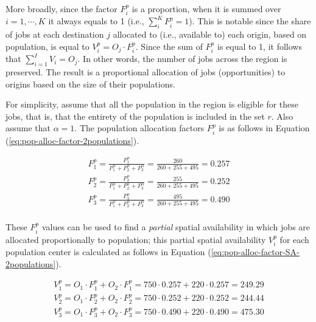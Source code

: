 \documentclass[]{elsarticle} %
\begin{document}
More broadly, since the factor \(F^p_{i}\) is a proportion, when it is
summed over \(i=1,\cdots,K\) it always equals to 1 (i.e.,
\(\sum_i^{K} F^p_{i} = 1\)). This is notable since the share of jobs at
each destination \(j\) allocated to (i.e., available to) each origin,
based on population, is equal to \(V^p_{i} = O_j \cdot F^p_{i}\). Since
the sum of \(F^p_{i}\) is equal to 1, it follows that
\(\sum_{i=1}^I V_{i} = O_j\). In other words, the number of jobs across
the region is preserved. The result is a proportional allocation of jobs
(opportunities) to origins based on the size of their populations.

For simplicity, assume that all the population in the region is eligible
for these jobs, that is, that the entirety of the population is included
in the set \(r\). Also assume that \(\alpha=1\). The population
allocation factors \(F^p_{i}\) is as follows in Equation
(\ref{eq:pop-alloc-factor-2populations}).

\begin{equation}
\label{eq:pop-alloc-factor-2populations}
\begin{array}{l}
F^p_{1} = \frac{P_1 ^\alpha}{P_1^\alpha + P_2^\alpha + P_3^\alpha} = \frac{260}{260 + 255 + 495} = 0.257\\
F^p_{2} = \frac{P_2^\alpha}{P_1^\alpha + P_2^\alpha + P_3^\alpha}  = \frac{255}{260 + 255 + 495} = 0.252\\
F^p_{3} = \frac{P_3^\alpha}{P_1^\alpha + P_2^\alpha + P_3^\alpha}  = \frac{495}{260 + 255 + 495} = 0.490\\
\end{array}
\end{equation}

These \(F^p_{i}\) values can be used to find a \emph{partial} spatial
availability in which jobs are allocated proportionally to population;
this partial spatial availability \(V^p_{i}\) for each population center
is calculated as follows in Equation
(\ref{eq:pop-alloc-factor-SA-2populations}).

\begin{equation}
\label{eq:pop-alloc-factor-SA-2populations}
\begin{array}{l}
V^p_{1} = O_1 \cdot F^p_{1} + O_2 \cdot F^p_{1} = 750 \cdot 0.257 + 220 \cdot 0.257 = 249.29 \\
V^p_{2} = O_1 \cdot F^p_{2} + O_2 \cdot F^p_{2} = 750 \cdot 0.252 + 220 \cdot 0.252 = 244.44 \\
V^p_{3} = O_1 \cdot F^p_{3} + O_2 \cdot F^p_{3}= 750 \cdot 0.490 + 220 \cdot 0.490 = 475.30 \\
\end{array}
\end{equation}
\end{document}

